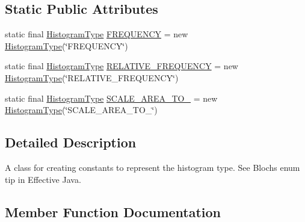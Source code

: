 \subsection*{Static Public Attributes}
\begin{DoxyCompactItemize}
\item 
static final \mbox{\hyperlink{classorg_1_1jfree_1_1data_1_1statistics_1_1_histogram_type}{Histogram\+Type}} \mbox{\hyperlink{classorg_1_1jfree_1_1data_1_1statistics_1_1_histogram_type_ad24980608aa08ef7f2985cc0af34fa16}{F\+R\+E\+Q\+U\+E\+N\+CY}} = new \mbox{\hyperlink{classorg_1_1jfree_1_1data_1_1statistics_1_1_histogram_type}{Histogram\+Type}}(\char`\"{}F\+R\+E\+Q\+U\+E\+N\+CY\char`\"{})
\item 
static final \mbox{\hyperlink{classorg_1_1jfree_1_1data_1_1statistics_1_1_histogram_type}{Histogram\+Type}} \mbox{\hyperlink{classorg_1_1jfree_1_1data_1_1statistics_1_1_histogram_type_a96344f572d830e61e4d27c537a597ee2}{R\+E\+L\+A\+T\+I\+V\+E\+\_\+\+F\+R\+E\+Q\+U\+E\+N\+CY}} = new \mbox{\hyperlink{classorg_1_1jfree_1_1data_1_1statistics_1_1_histogram_type}{Histogram\+Type}}(\char`\"{}R\+E\+L\+A\+T\+I\+V\+E\+\_\+\+F\+R\+E\+Q\+U\+E\+N\+CY\char`\"{})
\item 
static final \mbox{\hyperlink{classorg_1_1jfree_1_1data_1_1statistics_1_1_histogram_type}{Histogram\+Type}} \mbox{\hyperlink{classorg_1_1jfree_1_1data_1_1statistics_1_1_histogram_type_a6b7db4bc5397a81b538e2931bf060135}{S\+C\+A\+L\+E\+\_\+\+A\+R\+E\+A\+\_\+\+T\+O\+\_}} = new \mbox{\hyperlink{classorg_1_1jfree_1_1data_1_1statistics_1_1_histogram_type}{Histogram\+Type}}(\char`\"{}S\+C\+A\+L\+E\+\_\+\+A\+R\+E\+A\+\_\+\+T\+O\+\_\char`\"{})
\end{DoxyCompactItemize}


\subsection{Detailed Description}
A class for creating constants to represent the histogram type. See Bloch\textquotesingle{}s enum tip in \textquotesingle{}Effective Java\textquotesingle{}. 

\subsection{Member Function Documentation}
\mbox{\label{classorg_1_1jfree_1_1data_1_1statistics_1_1_histogram_type_aa153babad29d6397a5b0fd702d4f327b}} 
